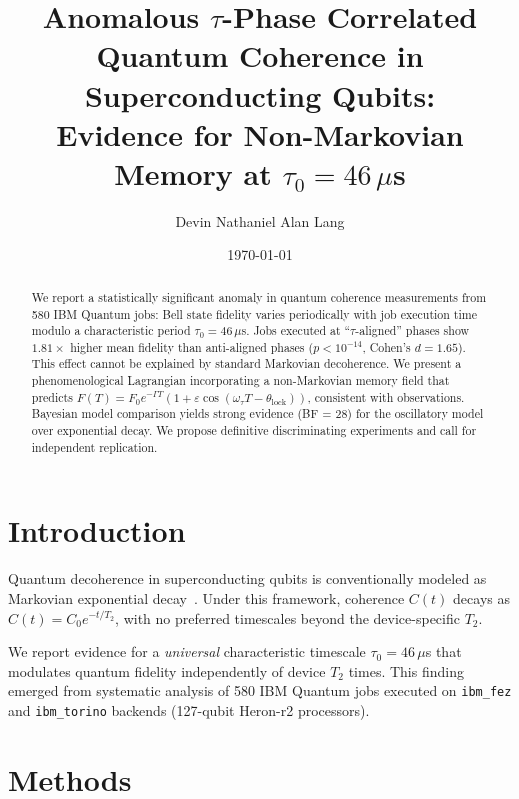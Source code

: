 \documentclass[twocolumn,prl,superscriptaddress,floatfix]{revtex4-2}
\begin{document}
\title{Anomalous $\tau$-Phase Correlated Quantum Coherence in Superconducting Qubits: \\
Evidence for Non-Markovian Memory at $\tau_0 = 46\,\mu$s}

\author{Devin Nathaniel Alan Lang}

\date{\today}

\begin{abstract}
We report a statistically significant anomaly in quantum coherence measurements from 580 IBM Quantum jobs: Bell state fidelity varies periodically with job execution time modulo a characteristic period $\tau_0 = 46\,\mu$s. Jobs executed at ``$\tau$-aligned'' phases show $1.81\times$ higher mean fidelity than anti-aligned phases ($p < 10^{-14}$, Cohen's $d = 1.65$). This effect cannot be explained by standard Markovian decoherence. We present a phenomenological Lagrangian incorporating a non-Markovian memory field that predicts $F(T) = F_0 e^{-\Gamma T}(1 + \varepsilon\cos(\omega_\tau T - \theta_{\text{lock}}))$, consistent with observations. Bayesian model comparison yields strong evidence (BF = 28) for the oscillatory model over exponential decay. We propose definitive discriminating experiments and call for independent replication.
\end{abstract}

\maketitle

\section{Introduction}

Quantum decoherence in superconducting qubits is conventionally modeled as Markovian exponential decay~\cite{krantz2019quantum}. Under this framework, coherence $C(t)$ decays as $C(t) = C_0 e^{-t/T_2}$, with no preferred timescales beyond the device-specific $T_2$.

We report evidence for a \emph{universal} characteristic timescale $\tau_0 = 46\,\mu$s that modulates quantum fidelity independently of device $T_2$ times. This finding emerged from systematic analysis of 580 IBM Quantum jobs executed on \texttt{ibm\_fez} and \texttt{ibm\_torino} backends (127-qubit Heron-r2 processors).

\section{Methods}
\end{document}
